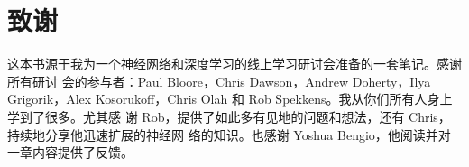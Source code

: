 
\chapter{致谢}
\label{ch:acknowledgements}

这本书源于我为一个神经网络和深度学习的线上学习研讨会准备的一套笔记。感谢所有研讨
会的参与者：Paul Bloore，Chris Dawson，Andrew Doherty，Ilya Grigorik，Alex
Kosorukoff，Chris Olah 和 Rob Spekkens。我从你们所有人身上学到了很多。尤其感
谢 Rob，提供了如此多有见地的问题和想法，还有 Chris，持续地分享他迅速扩展的神经网
络的知识。也感谢 Yoshua Bengio，他阅读并对一章内容提供了反馈。
